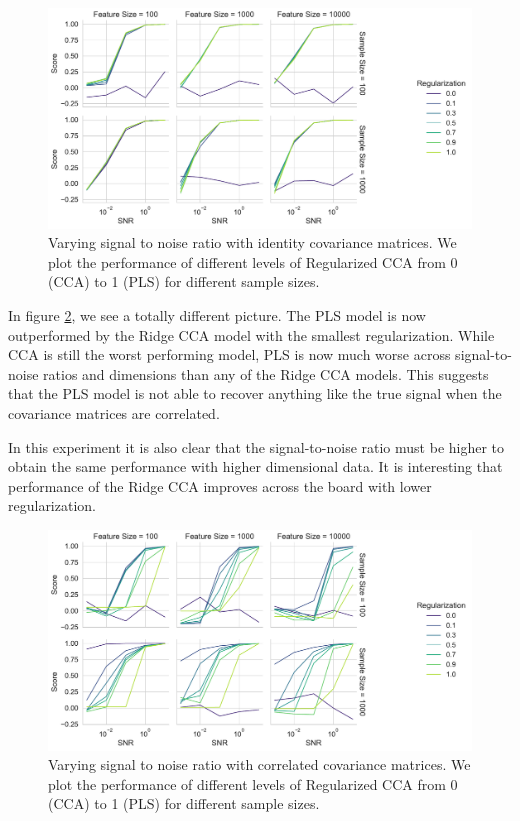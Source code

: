 \begin{figure}
    \centering
    \includegraphics[width=\linewidth]{figures/brain_behaviour_sim/snr_vs_scores_facet_identity}
    \caption{Varying signal to noise ratio with identity covariance matrices. We plot the performance of different levels of Regularized CCA from 0 (CCA) to 1 (PLS) for different sample sizes. }\label{fig:snr-scores-identity}
\end{figure}

In figure \ref{fig:snr-scores-random}, we see a totally different picture.
The PLS model is now outperformed by the Ridge CCA model with the smallest regularization.
While CCA is still the worst performing model, PLS is now much worse across signal-to-noise ratios and dimensions than any of the Ridge CCA models.
This suggests that the PLS model is not able to recover anything like the true signal when the covariance matrices are correlated.


In this experiment it is also clear that the signal-to-noise ratio must be higher to obtain the same performance with higher dimensional data.
It is interesting that performance of the Ridge CCA improves across the board with lower regularization.


\begin{figure}
    \centering
    \includegraphics[width=\linewidth]{figures/brain_behaviour_sim/snr_vs_scores_facet_random}
    \caption{Varying signal to noise ratio with correlated covariance matrices. We plot the performance of different levels of Regularized CCA from 0 (CCA) to 1 (PLS) for different sample sizes.}\label{fig:snr-scores-random}
\end{figure}

